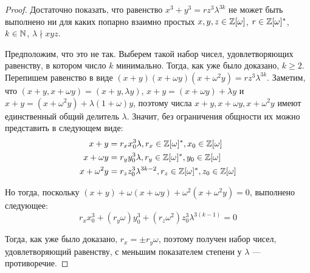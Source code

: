 \begin{proof}
	Достаточно показать, что равенство $x^3 + y^3 = rz^3\lambda^{3k}$ не может быть выполнено ни для каких попарно взаимно простых $x, y, z \in \mathbb{Z}[\omega]$, $r \in \mathbb{Z}[\omega]^*$, $k \in \mathbb{N}$, $\lambda \nmid xyz$.
	
	Предположим, что это не так. Выберем такой набор чисел, удовлетворяющих равенству, в котором число $k$ минимально. Тогда, как уже было доказано, $k \ge 2$. Перепишем равенство в виде $(x + y)(x + \omega y)(x + \omega^2 y) = rz^3\lambda^{3k}$. Заметим, что $(x + y, x + \omega y) = (x + y, \lambda y)$, $x + y = (x + \omega y) + \lambda y$ и $x + y = (x + \omega^2 y) + \lambda (1 + \omega) y$, поэтому числа $x + y, x + \omega y, x + \omega^2 y$ имеют единственный общий делитель $\lambda$. Значит, без ограничения общности их можно представить в следующем виде:
	\begin{align*}
		x + y &= r_x x_0^3 \lambda, r_x \in \mathbb{Z}[\omega]^*, x_0 \in \mathbb{Z}[\omega]\\
		x + \omega y &= r_y y_0^3 \lambda, r_y \in \mathbb{Z}[\omega]^*, y_0 \in \mathbb{Z}[\omega]\\
		x + \omega^2y &= r_z z_0^3 \lambda^{3k - 2}, r_z \in \mathbb{Z}[\omega]^*, z_0 \in \mathbb{Z}[\omega]
	\end{align*}
	
	Но тогда, поскольку $(x + y) + \omega(x + \omega y) + \omega^2(x + \omega^2 y) = 0$, выполнено следующее:
	\[r_x x_0^3 + (r_y\omega) y_0^3 + (r_z \omega^2) z_0^3 \lambda^{3(k - 1)} = 0\]
	
	Тогда, как уже было доказано, $r_x = \pm r_y \omega$, поэтому получен набор чисел, удовлетворяющий равенству, с меньшим показателем степени у $\lambda$ --- противоречие.
\end{proof}
